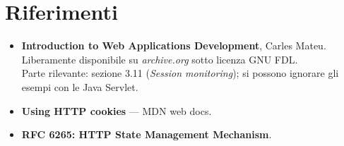 \section{Riferimenti}

\begin{itemize}
  \item \textbf{Introduction to Web Applications Development}, Carles Mateu.
        Liberamente disponibile su \textit{archive.org} sotto licenza GNU FDL. \\
        Parte rilevante: sezione 3.11 (\textit{Session monitoring}); si possono
        ignorare gli esempi con le Java Servlet.
  \item \textbf{Using HTTP cookies} --- MDN web docs. \\
  \item \textbf{RFC 6265: HTTP State Management Mechanism}. \\
\end{itemize}
